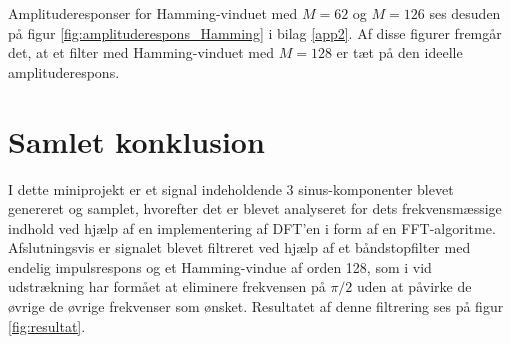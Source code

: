 Amplituderesponser for Hamming-vinduet med $M = 62$ og $M = 126$ ses desuden på figur \ref{fig:amplituderespons_Hamming} i bilag \ref{app2}. Af disse figurer fremgår det, at et filter med Hamming-vinduet med $M = 128$ er tæt på den ideelle amplituderespons.

\section{Samlet konklusion}
I dette miniprojekt er et signal indeholdende 3 sinus-komponenter blevet genereret og samplet, hvorefter det er blevet analyseret for dets frekvensmæssige indhold ved hjælp af en implementering af DFT'en i form af en FFT-algoritme. Afslutningsvis er signalet blevet filtreret ved hjælp af et båndstopfilter med endelig impulsrespons og et Hamming-vindue af orden 128, som i vid udstrækning har formået at eliminere frekvensen på $\pi/2$ uden at påvirke de øvrige de øvrige frekvenser som ønsket. Resultatet af denne filtrering ses på figur \ref{fig:resultat}.